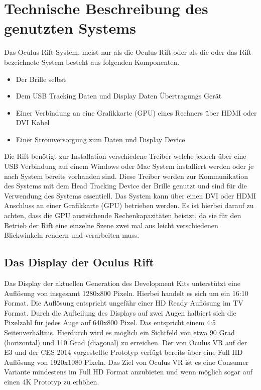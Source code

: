 \documentclass[pagesize, paper=a4, fontsize=12pt,titlepage=true, headings=small, headnosepline, abstractoff, liststotoc, nochapterprefix, plainheadsepline, twoside]{scrreprt}
\begin{document}
\section{Technische Beschreibung des genutzten Systems}
Das Oculus Rift System, meist nur als die Oculus Rift oder als die oder das Rift bezeichnete System besteht aus folgenden Komponenten.
\begin{itemize}
\item Der Brille selbst
\item Dem USB Tracking Daten und Display Daten Übertragungs Gerät
\item Einer Verbindung an eine Grafikkarte (GPU) eines Rechners über HDMI oder DVI Kabel
\item Einer Stromversorgung zum Daten und Display Device
\end{itemize}
Die Rift benötigt zur Installation verschiedene Treiber welche jedoch über eine USB Verbindung auf einem Windows oder Mac System installiert werden oder je nach System bereits vorhanden sind. Diese Treiber werden zur Kommunikation des Systems mit dem Head Tracking Device der Brille genutzt und sind für die Verwendung des Systems essentiell. Das System kann über einen DVI oder HDMI Anschluss an einer Grafikkarte (GPU) betrieben werden. Es ist hierbei darauf zu achten, dass die GPU ausreichende Rechenkapazitäten beistzt, da sie für den Betrieb der Rift eine einzelne Szene zwei mal aus leicht verschiedenen Blickwinkeln rendern und verarbeiten muss.

\subsection{Das Display der Oculus Rift}
Das Display der aktuellen Generation des Development Kits unterstützt eine Auflösung von insgesamt 1280x800 Pixeln. Hierbei handelt es sich um ein 16:10 Format. Die Auflösung entspricht ungefähr einer HD Ready Auflösung im TV Format. Durch die Aufteilung des Displays auf zwei Augen halbiert sich die Pixelzahl für jedes Auge auf 640x800 Pixel. Das entspricht einem 4:5 Seitenverhältnis. Hierdurch wird es möglich ein Sichtfeld von etwa 90 Grad (horizontal) und 110 Grad (diagonal) zu erreichen. Der von Oculus VR auf der E3 und der CES 2014 vorgestellte Prototyp verfügt bereits über eine Full HD Auflösung von 1920x1080 Pixeln. Das Ziel von Oculus VR ist es eine Consumer Variante mindestens im Full HD Format anzubieten und wenn möglich sogar auf einen 4K Prototyp zu erhöhen.
\end{document}
